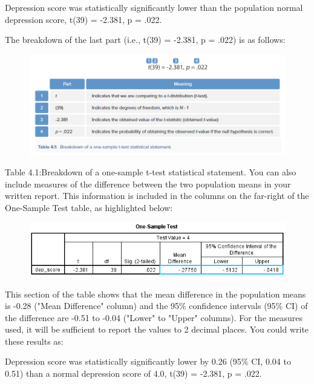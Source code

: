 \documentclass[]{article}
\begin{document}
\begin{framed}

Depression score was statistically significantly lower than the population normal depression score, t(39) = -2.381, p = .022.



\end{framed}
The breakdown of the last part (i.e., t(39) = -2.381, p = .022) is as follows:

\begin{figure}
\centering
\includegraphics[width=0.7\linewidth]{OneSample/OneSample-DescriptiveStatistics4}
\label{fig:OneSample-DescriptiveStatistics4}
\end{figure}

Table 4.1:Breakdown of a one-sample t-test statistical statement.
You can also include measures of the difference between the two population means in your written report. This information is included in the columns on the far-right of the One-Sample Test table, as highlighted below:


\begin{figure}
\centering
\includegraphics[width=0.7\linewidth]{OneSample/OneSample-DescriptiveStatistics5}
\label{fig:OneSample-DescriptiveStatistics5}
\end{figure}

This section of the table shows that the mean difference in the population means is -0.28 ("Mean Difference" column) and the 95\% confidence intervals (95\% CI) of the difference are -0.51 to -0.04 ("Lower" to "Upper" columns). For the measures used, it will be sufficient to report the values to 2 decimal places. You could write these results as:

\begin{framed}
\noindent Depression score was statistically significantly lower by 0.26 (95\% CI, 0.04 to 0.51) than a normal depression score of 4.0, t(39) = -2.381, p = .022.

\end{framed}
\newpage
\end{document}
